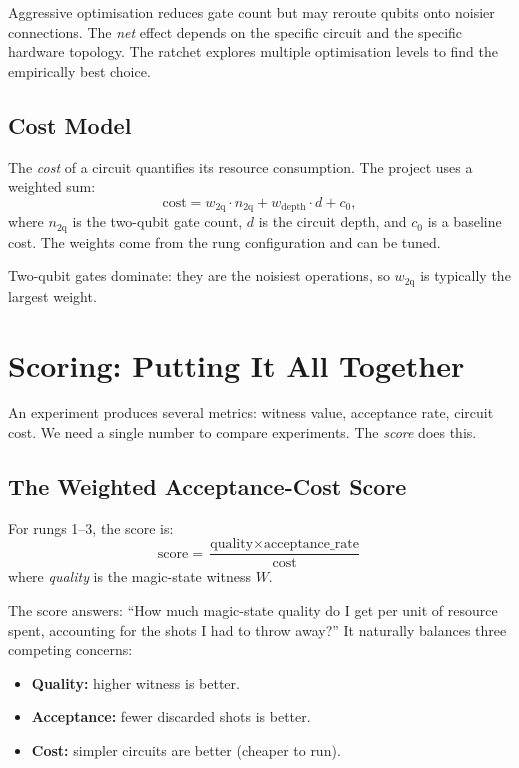 \documentclass[11pt,a4paper,twoside]{report}
\theoremstyle{definition}
\begin{document}
\begin{warning}[title={Higher Is Not Always Better}]
Aggressive optimisation reduces gate count but may reroute qubits onto
noisier connections. The \emph{net} effect depends on the specific
circuit and the specific hardware topology. The ratchet explores multiple
optimisation levels to find the empirically best choice.
\end{warning}

\section{Cost Model}

The \emph{cost} of a circuit quantifies its resource consumption. The
project uses a weighted sum:
\begin{equation}
  \text{cost} = w_{\text{2q}} \cdot n_{\text{2q}}
              + w_{\text{depth}} \cdot d + c_0,
\end{equation}
where $n_{\text{2q}}$ is the two-qubit gate count, $d$ is the circuit
depth, and $c_0$ is a baseline cost. The weights come from the rung
configuration and can be tuned.

Two-qubit gates dominate: they are the noisiest operations, so
$w_{\text{2q}}$ is typically the largest weight.

\chapter{Scoring: Putting It All Together}
\label{ch:scoring}

An experiment produces several metrics: witness value, acceptance rate,
circuit cost. We need a single number to compare experiments. The
\emph{score} does this.

\section{The Weighted Acceptance-Cost Score}

For rungs 1--3, the score is:
\begin{equation}
  \boxed{
    \text{score} = \frac{\text{quality} \times \text{acceptance\_rate}}{\text{cost}}
  }
  \label{eq:wac}
\end{equation}
where \emph{quality} is the magic-state witness $W$.

\begin{intuition}
The score answers: ``How much magic-state quality do I get per unit of
resource spent, accounting for the shots I had to throw away?'' It
naturally balances three competing concerns:
\begin{itemize}[nosep]
  \item \textbf{Quality:} higher witness is better.
  \item \textbf{Acceptance:} fewer discarded shots is better.
  \item \textbf{Cost:} simpler circuits are better (cheaper to run).
\end{itemize}
\end{intuition}
\end{document}
